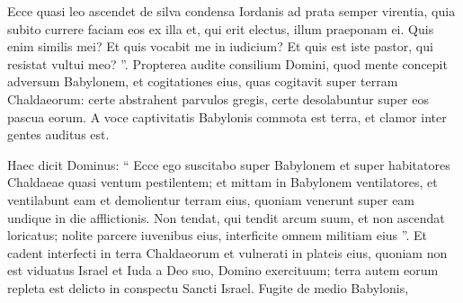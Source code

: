 \begin{biblechapter}
\begin{biblechapter}
\begin{biblechapter}
\begin{biblechapter}
\begin{biblechapter}
\begin{biblechapter}
\begin{biblechapter}
\begin{biblechapter}
\begin{biblechapter}
\begin{biblechapter}
\begin{biblechapter}
\begin{biblechapter}
\begin{biblechapter}
\begin{biblechapter}
\begin{biblechapter}
\begin{biblechapter}
\begin{biblechapter}
\begin{biblechapter}
\begin{biblechapter}
\begin{biblechapter}
\begin{biblechapter}
\begin{biblechapter}
\begin{biblechapter}
\begin{biblechapter}
\begin{biblechapter}
\begin{biblechapter}
\begin{biblechapter}
\begin{biblechapter}
\begin{biblechapter}
\begin{biblechapter}
\begin{biblechapter}
\begin{biblechapter}
\begin{biblechapter}
\begin{biblechapter}
\begin{biblechapter}
\begin{biblechapter}
\begin{biblechapter}
\begin{biblechapter}
\begin{biblechapter}
\begin{biblechapter}
\begin{biblechapter}
\begin{biblechapter}
\begin{biblechapter}
\begin{biblechapter}
\begin{biblechapter}
\begin{biblechapter}
\begin{biblechapter}
\begin{biblechapter}
\begin{biblechapter}
\begin{biblechapter}
\verse Ecce quasi leo ascendet de silva condensa Iordanis ad prata semper virentia, quia subito currere faciam eos ex illa et, qui erit electus, illum praeponam ei. Quis enim similis mei? Et quis vocabit me in iudicium? Et quis est iste pastor, qui resistat vultui meo? ”. 
\verse Propterea audite consilium Domini, quod mente concepit adversum Babylonem, et cogitationes eius, quas cogitavit super terram Chaldaeorum: certe abstrahent parvulos gregis, certe desolabuntur super eos pascua eorum. 
\verse A voce captivitatis Babylonis commota est terra, et clamor inter gentes auditus est.
 
\begin{biblechapter}
\verse Haec dicit Dominus:
 “ Ecce ego suscitabo super Babylonem
 et super habitatores Chaldaeae
 quasi ventum pestilentem;
 \verse et mittam in Babylonem ventilatores,
 et ventilabunt eam
 et demolientur terram eius,
 quoniam venerunt super eam undique
 in die afflictionis.
 \verse Non tendat, qui tendit arcum suum,
 et non ascendat loricatus;
 nolite parcere iuvenibus eius,
 interficite omnem militiam eius ”.
 \verse Et cadent interfecti in terra Chaldaeorum
 et vulnerati in plateis eius,
 \verse quoniam non est viduatus Israel et Iuda
 a Deo suo, Domino exercituum;
 terra autem eorum repleta est delicto
 in conspectu Sancti Israel.
 \verse Fugite de medio Babylonis,

\end{biblechapter}
\end{biblechapter}
\end{biblechapter}
\end{biblechapter}
\end{biblechapter}
\end{biblechapter}
\end{biblechapter}
\end{biblechapter}
\end{biblechapter}
\end{biblechapter}
\end{biblechapter}
\end{biblechapter}
\end{biblechapter}
\end{biblechapter}
\end{biblechapter}
\end{biblechapter}
\end{biblechapter}
\end{biblechapter}
\end{biblechapter}
\end{biblechapter}
\end{biblechapter}
\end{biblechapter}
\end{biblechapter}
\end{biblechapter}
\end{biblechapter}
\end{biblechapter}
\end{biblechapter}
\end{biblechapter}
\end{biblechapter}
\end{biblechapter}
\end{biblechapter}
\end{biblechapter}
\end{biblechapter}
\end{biblechapter}
\end{biblechapter}
\end{biblechapter}
\end{biblechapter}
\end{biblechapter}
\end{biblechapter}
\end{biblechapter}
\end{biblechapter}
\end{biblechapter}
\end{biblechapter}
\end{biblechapter}
\end{biblechapter}
\end{biblechapter}
\end{biblechapter}
\end{biblechapter}
\end{biblechapter}
\end{biblechapter}
\end{biblechapter}
